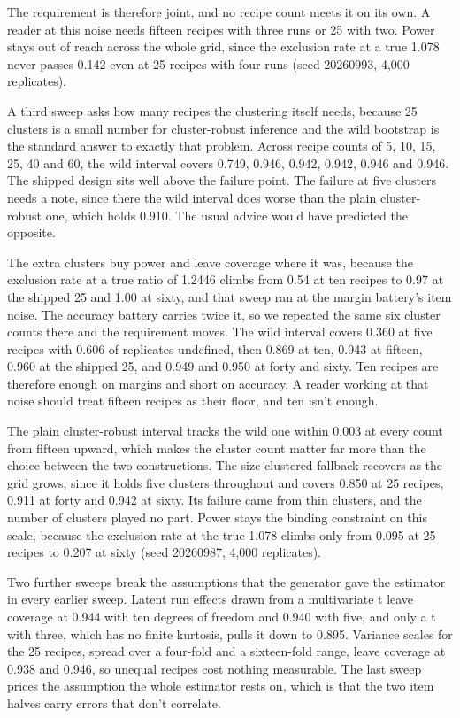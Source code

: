 The requirement is therefore joint, and no recipe count meets it on its own. A reader at this noise needs fifteen recipes with three runs or 25 with two. Power stays out of reach across the whole grid, since the exclusion rate at a true 1.078 never passes 0.142 even at 25 recipes with four runs (seed 20260993, 4,000 replicates).

A third sweep asks how many recipes the clustering itself needs, because 25 clusters is a small number for cluster-robust inference and the wild bootstrap is the standard answer to exactly that problem. Across recipe counts of 5, 10, 15, 25, 40 and 60, the wild interval covers 0.749, 0.946, 0.942, 0.942, 0.946 and 0.946. The shipped design sits well above the failure point. The failure at five clusters needs a note, since there the wild interval does worse than the plain cluster-robust one, which holds 0.910. The usual advice would have predicted the opposite.

The extra clusters buy power and leave coverage where it was, because the exclusion rate at a true ratio of 1.2446 climbs from 0.54 at ten recipes to 0.97 at the shipped 25 and 1.00 at sixty, and that sweep ran at the margin battery's item noise. The accuracy battery carries twice it, so we repeated the same six cluster counts there and the requirement moves. The wild interval covers 0.360 at five recipes with 0.606 of replicates undefined, then 0.869 at ten, 0.943 at fifteen, 0.960 at the shipped 25, and 0.949 and 0.950 at forty and sixty. Ten recipes are therefore enough on margins and short on accuracy. A reader working at that noise should treat fifteen recipes as their floor, and ten isn't enough.

The plain cluster-robust interval tracks the wild one within 0.003 at every count from fifteen upward, which makes the cluster count matter far more than the choice between the two constructions. The size-clustered fallback recovers as the grid grows, since it holds five clusters throughout and covers 0.850 at 25 recipes, 0.911 at forty and 0.942 at sixty. Its failure came from thin clusters, and the number of clusters played no part. Power stays the binding constraint on this scale, because the exclusion rate at the true 1.078 climbs only from 0.095 at 25 recipes to 0.207 at sixty (seed 20260987, 4,000 replicates).

Two further sweeps break the assumptions that the generator gave the estimator in every earlier sweep. Latent run effects drawn from a multivariate t leave coverage at 0.944 with ten degrees of freedom and 0.940 with five, and only a t with three, which has no finite kurtosis, pulls it down to 0.895. Variance scales for the 25 recipes, spread over a four-fold and a sixteen-fold range, leave coverage at 0.938 and 0.946, so unequal recipes cost nothing measurable. The last sweep prices the assumption the whole estimator rests on, which is that the two item halves carry errors that don't correlate.

